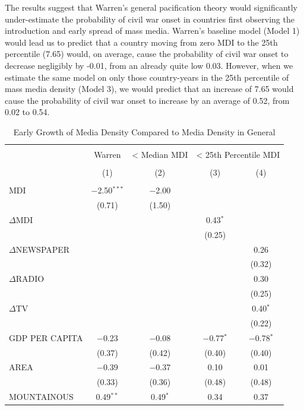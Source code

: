 \documentclass[11pt,article,oneside]{memoir}
\begin{document}
The results suggest that Warren's general pacification theory would
significantly under-estimate the probability of civil war onset in
countries first observing the introduction and early spread of mass
media. Warren's baseline model (Model 1) would lead us to predict that a
country moving from zero MDI to the 25th percentile (7.65) would, on
average, cause the probability of civil war onset to decrease negligibly
by -0.01, from an already quite low 0.03. However, when we estimate the
same model on only those country-years in the 25th percentile of mass
media density (Model 3), we would predict that an increase of 7.65 would
cause the probability of civil war onset to increase by an average of
0.52, from 0.02 to 0.54.

\begin{table}[!htbp] \centering 
  \caption{Early Growth of Media Density Compared to Media Density in General} 
  \label{} 
\scriptsize 
\begin{tabular}{@{\extracolsep{5pt}}lcccc} 
\\[-1.8ex]\hline \\[-1.8ex] 
 & Warren & < Median MDI & \multicolumn{2}{c}{< 25th Percentile MDI} \\ 
\\[-1.8ex] & (1) & (2) & (3) & (4)\\ 
\hline \\[-1.8ex] 
 MDI & $-$2.50$^{***}$ & $-$2.00 &  &  \\ 
  & (0.71) & (1.50) &  &  \\ 
  $\Delta$MDI &  &  & 0.43$^{*}$ &  \\ 
  &  &  & (0.25) &  \\ 
  $\Delta$NEWSPAPER &  &  &  & 0.26 \\ 
  &  &  &  & (0.32) \\ 
  $\Delta$RADIO &  &  &  & 0.30 \\ 
  &  &  &  & (0.25) \\ 
  $\Delta$TV &  &  &  & 0.40$^{*}$ \\ 
  &  &  &  & (0.22) \\ 
  GDP PER CAPITA & $-$0.23 & $-$0.08 & $-$0.77$^{*}$ & $-$0.78$^{*}$ \\ 
  & (0.37) & (0.42) & (0.40) & (0.40) \\ 
  AREA & $-$0.39 & $-$0.37 & 0.10 & 0.01 \\ 
  & (0.33) & (0.36) & (0.48) & (0.48) \\ 
  MOUNTAINOUS & 0.49$^{**}$ & 0.49$^{*}$ & 0.34 & 0.37 \\ 

\end{tabular}
\end{table}
\end{document}
